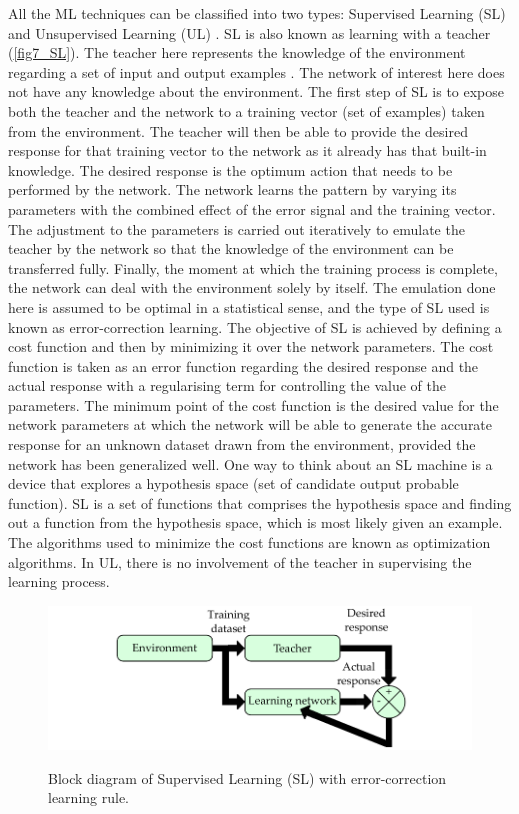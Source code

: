 All the \ac{ML} techniques can be classified into two types: Supervised Learning (\ac{SL}) and Unsupervised Learning (\ac{UL}) \cite{bhattacharya2015relevance,haykin1994neural}. \ac{SL} is also known as learning with a teacher (\autoref{fig7_SL}). The teacher here represents the knowledge of the environment regarding a set of input and output examples \cite{kotsiantis2007supervised,tipping2001sparse}. The network of interest here does not have any knowledge about the environment. The first step of \ac{SL} is to expose both the teacher and the network to a training vector (set of examples) taken from the environment. The teacher will then be able to provide the desired response for that training vector to the network as it already has that built-in knowledge. The desired response is the optimum action that needs to be performed by the network. The network learns the pattern by varying its parameters with the combined effect of the error signal and the training vector. The adjustment to the parameters is carried out iteratively to emulate the teacher by the network so that the knowledge of the environment can be transferred fully. Finally, the moment at which the training process is complete, the network can deal with the environment solely by itself. The emulation done here is assumed to be optimal in a statistical sense, and the type of \ac{SL} used is known as error-correction learning. The objective of \ac{SL} is achieved by defining a cost function and then by minimizing it over the network parameters. The cost function is taken as an error function regarding the desired response and the actual response with a regularising term for controlling the value of the parameters. The minimum point of the cost function is the desired value for the network parameters at which the network will be able to generate the accurate response for an unknown dataset drawn from the environment, provided the network has been generalized well. One way to think about an \ac{SL} machine is a device that explores a hypothesis space (set of candidate output probable function). \ac{SL} is a set of functions that comprises the hypothesis space and finding out a function from the hypothesis space, which is most likely given an example.  The algorithms used to minimize the cost functions are known as optimization algorithms. In \ac{UL}, there is no involvement of the teacher in supervising the learning process.

 \begin{figure}[bth]
 	\myfloatalign
 	{\includegraphics[width=\linewidth]{images/Ch2/fig7_SL2}} \quad
 	\caption[Block diagram of Supervised Learning (SL) with error-correction learning rule.]{Block diagram of Supervised Learning (SL) with error-correction learning rule.}\label{fig7_SL}
 \end{figure}
